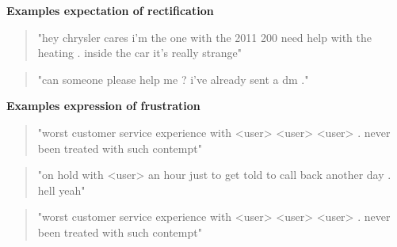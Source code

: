 \textbf{Examples expectation of rectification}
\begin{quote}
    "hey chrysler cares i'm the one with the 2011 200 need help with the heating . inside the car it's really strange"
\end{quote}
\begin{quote}
    "can someone please help me ? i've already sent a dm ."
\end{quote}
\textbf{Examples expression of frustration}
\begin{quote}
    "worst customer service experience with <user> <user> <user> . never been treated with such contempt"
\end{quote}
\begin{quote}
    "on hold with <user> an hour just to get told to call back another day . hell yeah"
\end{quote}
\begin{quote}
    "worst customer service experience with <user> <user> <user> . never been treated with such contempt"
\end{quote}




